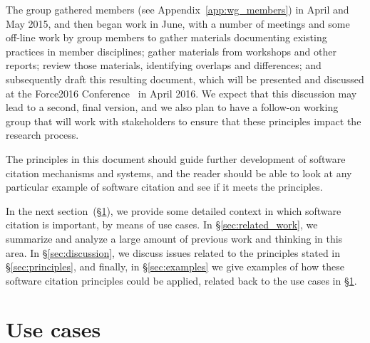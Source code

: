 \documentclass[11pt, oneside]{amsart}
\begin{document}
The group gathered members (see Appendix~\ref{app:wg_members}) in April and May 2015,
and then began work in June, with a number of meetings
and some off-line work by group members to gather materials documenting existing
practices in member disciplines; gather materials from workshops and other reports;
review those materials, identifying overlaps and differences; and subsequently draft this resulting document,
which will be presented and discussed at the Force2016 Conference~\cite{force2016}
in April 2016.  We expect that this discussion may lead to a second, final version, and we also
plan to have a follow-on working group that will work with stakeholders to ensure that
these principles impact the research process.

The principles in this document should guide further development of software citation
mechanisms and systems, and the reader should be able to look at any particular example
of software citation and see if it meets the principles.

In the next section~(\S\ref{sec:use_cases}), we provide some detailed context in
which software citation is important, by means of use cases. In
\S\ref{sec:related_work}, we summarize and analyze a large amount of previous
work and thinking in this area. In \S\ref{sec:discussion}, we discuss issues
related to the principles stated in \S\ref{sec:principles}, and finally, in
\S\ref{sec:examples} we give examples of how these software citation principles
could be applied, related back to the use cases in \S\ref{sec:use_cases}.


\section{Use cases}
\label{sec:use_cases}
\end{document}
